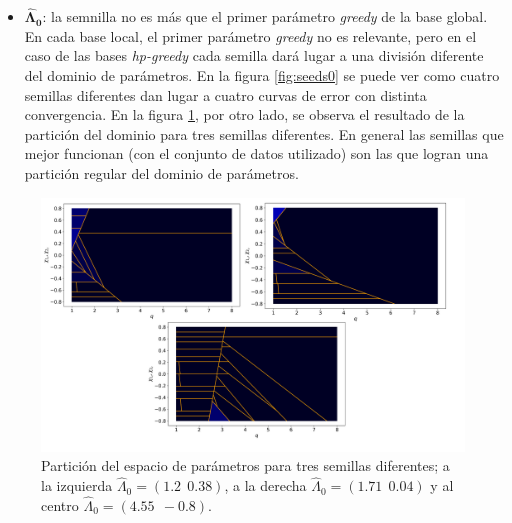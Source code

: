 \begin{itemize}
\item $\bm{\hat{\Lambda}_0}$: la semnilla no es más que el primer parámetro \textit{greedy} de la base global. En cada base local, el primer parámetro \textit{greedy} no es relevante, pero en el caso de las bases \textit{hp-greedy} cada semilla dará lugar a una división diferente del dominio de parámetros. En la figura \ref{fig:seeds0} se puede ver como cuatro semillas diferentes dan lugar a cuatro curvas de error con distinta convergencia. En la figura \ref{fig:seeds_part}, por otro lado, se observa el resultado de la partición del dominio para tres semillas diferentes. En general las semillas que mejor funcionan (con el conjunto de datos utilizado) son las que logran una partición regular del dominio de parámetros.
\end{itemize}



\begin{figure}[h!]
\centering
\includegraphics[width=1.05\columnwidth ,trim={1.1cm, 1cm, 1cm, 1.2cm}]{figs/3_semillas_particion.png}
\caption{Partición del espacio de parámetros para tres semillas diferentes; a la izquierda $\hat{\Lambda}_0 = (1.2 \ \ 0.38)$, a la derecha $\hat{\Lambda}_0 = (1.71 \ \ 0.04)$ y al centro $\hat{\Lambda}_0 =(4.55 \ \ -0.8)$.}
\label{fig:seeds_part}
\end{figure}